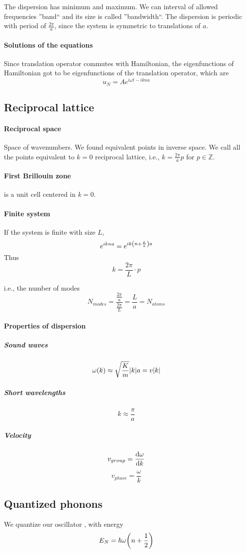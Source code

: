 The dispersion has minimum and maximum. We can interval of allowed frequencies ''band`` and its size is called ''bandwidth``. 
The dispersion is periodic with period of $\frac{2\pi}{a}$, since the system is symmetric to translations of $a$.

\paragraph{Solutions of the equations}
Since translation operator commutes with Hamiltonian, the eigenfunctions of Hamiltonian got to be eigenfunctions of the translation operator, which are
$$u_N = A e^{i\omega t - ikna}$$
\subsection{Reciprocal lattice}
\paragraph{Reciprocal space}
Space of wavenumbers. We found equivalent points in inverse space. We call all the points equivalent to $k=0$ reciprocal lattice, i.e., $k=\frac{2\pi}{a} p$ for $p \in \mathbb{Z}$.
\paragraph{First Brillouin zone}
is a unit cell centered in $k=0$.
\paragraph{Finite system}
If the system is finite with size $L$,
$$e^{ik na} = e^{ik \qty(n+\frac{L}{a})a}$$
Thus
$$k=\frac{2\pi}{L} \cdot p$$

i.e., the number of modes
$$N_{modes} = \frac{\frac{2\pi}{a}}{\frac{2\pi}{L}} = \frac{L}{a} = N_{atoms}$$

\paragraph{Properties of dispersion}
\subparagraph{Sound waves}
$$\omega(k) \approx \sqrt{\frac{K}{m}} \abs{k}a = v\abs{k}$$
\subparagraph{Short wavelengths}
$$k \approx \frac{\pi}{a}$$
\subparagraph{Velocity}
$$v_{group} = \dv{\omega}{k}$$
$$v_{phase} = \frac{\omega}{k}$$

\subsection{Quantized phonons }
We quantize our oscillator , with energy
$$E_N =\hbar \omega \qty(n+\frac{1}{2})$$
